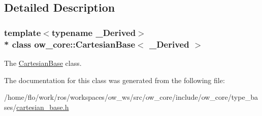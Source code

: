 \subsection{Detailed Description}
\subsubsection*{template$<$typename \+\_\+\+Derived$>$\\*
class ow\+\_\+core\+::\+Cartesian\+Base$<$ \+\_\+\+Derived $>$}

The \hyperlink{classow__core_1_1CartesianBase}{Cartesian\+Base} class. 

The documentation for this class was generated from the following file\+:\begin{DoxyCompactItemize}
\item 
/home/flo/work/ros/workspaces/ow\+\_\+ws/src/ow\+\_\+core/include/ow\+\_\+core/type\+\_\+bases/\hyperlink{cartesian__base_8h}{cartesian\+\_\+base.\+h}\end{DoxyCompactItemize}

